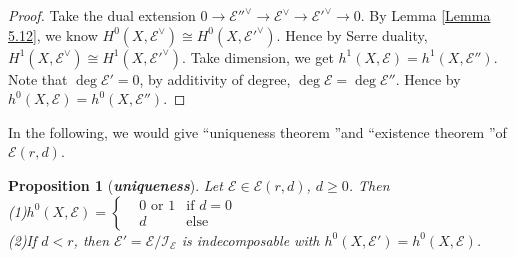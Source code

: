 \documentclass{ctexart}
\newtheorem{proposition}{Proposition}[section]
\newcommand{\leftquotes}{\textquotedblleft}
\newcommand{\rightquotes}{\textquotedblright}
\begin{document}
\begin{proof}
    Take the dual extension $0 \rightarrow \mathcal{E}''^{\vee} \rightarrow \mathcal{E}^{\vee} \rightarrow \mathcal{E}'^{\vee} \rightarrow 0$.
    By Lemma \ref{Lemma 5.12}, we know $H^{0}(X, \mathcal{E}^{\vee}) \cong H^{0}(X, \mathcal{E}'^{\vee})$.
    Hence by Serre duality, $H^{1}(X, \mathcal{E}^{\vee}) \cong H^{1}(X, \mathcal{E}'^{\vee})$.
    Take dimension, we get $h^{1}(X, \mathcal{E}) = h^{1}(X, \mathcal{E}'')$.
    Note that $\deg \mathcal{E}' = 0$, by additivity of degree, $\deg \mathcal{E} = \deg \mathcal{E}''$.
    Hence by $h^{0}(X, \mathcal{E}) = h^{0}(X, \mathcal{E}'')$.
\end{proof}
In the following, we would give \leftquotes uniqueness theorem \rightquotes and \leftquotes existence theorem \rightquotes of $\mathcal{E}(r, d)$.
\begin{proposition}[\textbf{\emph{uniqueness}}]
    Let $\mathcal{E}\in \mathcal{E}(r, d)$, $d \ge 0$.
    Then \\
    (1)$h^{0}(X, \mathcal{E}) =
    \left\{
        \begin{aligned}
            & 0 \text{ or } 1 & \text{if } d = 0 \\
            & d & \text{else}
        \end{aligned}
    \right.$
    \\
    (2)If $d < r$, then $\mathcal{E}' = \mathcal{E}/\mathcal{I}_{\mathcal{E}}$ is indecomposable with $h^{0}(X, \mathcal{E}') = h^{0}(X, \mathcal{E})$.
    \label{Proposition 5.4}
\end{proposition}
\end{document}
